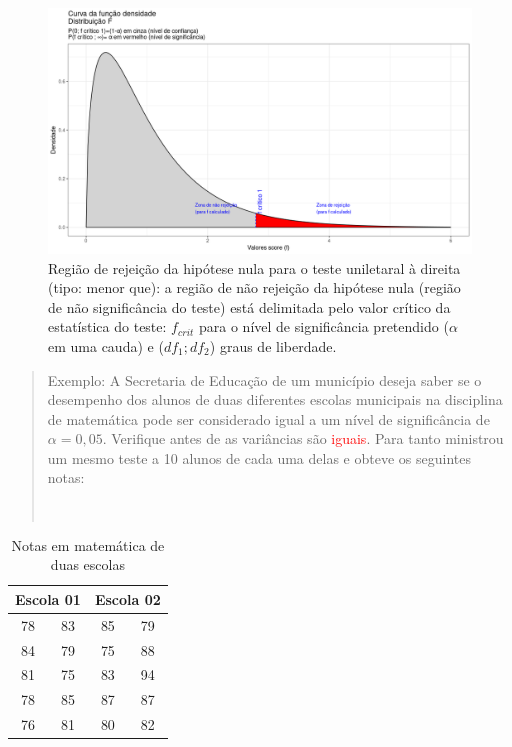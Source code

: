 \documentclass[
]{book}
\begin{document}
\hfill\break

\begin{figure}

{\centering \includegraphics[width=1\linewidth]{images11/f_test_2} 

}

\caption{Região de rejeição da hipótese nula para o teste uniletaral à direita (tipo: menor que): a região de não rejeição da hipótese nula (região de não significância do teste) está delimitada pelo valor crítico da estatística do teste: $f_{crit}$ para o nível de significância pretendido ($\alpha$ em uma cauda)  e ($df_{1}; df_{2}$) graus de liberdade.}\label{fig:fig87}
\end{figure}

\hfill\break

\begin{quote}
Exemplo: A Secretaria de Educação de um município deseja saber se o desempenho dos alunos de duas diferentes escolas municipais na disciplina de matemática pode ser considerado igual a um nível de significância de \(\alpha=0,05\). Verifique antes de as variâncias são \textcolor{red}{iguais}. Para tanto ministrou um mesmo teste a 10 alunos de cada uma delas e obteve os seguintes notas:\\
\strut \\
\end{quote}

\begin{table}[h]
\centering
\caption{Notas em matemática de duas escolas}
\begin{tabular}{|c|c|c|c|}
\hline 
\multicolumn{2}{|c|}{Escola 01} & \multicolumn{2}{|c|}{Escola 02} \\ 
\hline 
78 & 83 & 85 & 79 \\ 
\hline 
84 & 79 & 75 & 88 \\ 
\hline 
81 & 75 & 83 & 94 \\ 
\hline 
78 & 85 & 87 & 87 \\ 
\hline 
76 & 81 & 80 & 82 \\ 
\hline 
\end{tabular} 
\end{table}
\end{document}
